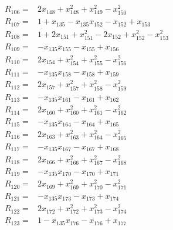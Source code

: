 \documentclass[11pt]{article}
\theoremstyle{remark}\newtheorem{remark}[theorem]{Remark}
\begin{document}
\begin{align*}
R_{106} ={}& 2x_{148} + x_{148}^{2} + x_{149}^{2} - x_{150}^{2} \\[4pt]
R_{107} ={}& 1 + x_{135} - x_{135}x_{152} - x_{152} + x_{153} \\[4pt]
R_{108} ={}& 1 + 2x_{151} + x_{151}^{2} - 2x_{152} + x_{152}^{2} - x_{153}^{2} \\[4pt]
R_{109} ={}& -x_{135}x_{155} - x_{155} + x_{156} \\[4pt]
R_{110} ={}& 2x_{154} + x_{154}^{2} + x_{155}^{2} - x_{156}^{2} \\[4pt]
R_{111} ={}& -x_{135}x_{158} - x_{158} + x_{159} \\[4pt]
R_{112} ={}& 2x_{157} + x_{157}^{2} + x_{158}^{2} - x_{159}^{2} \\[4pt]
R_{113} ={}& -x_{135}x_{161} - x_{161} + x_{162} \\[4pt]
R_{114} ={}& 2x_{160} + x_{160}^{2} + x_{161}^{2} - x_{162}^{2} \\[4pt]
R_{115} ={}& -x_{135}x_{164} - x_{164} + x_{165} \\[4pt]
R_{116} ={}& 2x_{163} + x_{163}^{2} + x_{164}^{2} - x_{165}^{2} \\[4pt]
R_{117} ={}& -x_{135}x_{167} - x_{167} + x_{168} \\[4pt]
R_{118} ={}& 2x_{166} + x_{166}^{2} + x_{167}^{2} - x_{168}^{2} \\[4pt]
R_{119} ={}& -x_{135}x_{170} - x_{170} + x_{171} \\[4pt]
R_{120} ={}& 2x_{169} + x_{169}^{2} + x_{170}^{2} - x_{171}^{2} \\[4pt]
R_{121} ={}& -x_{135}x_{173} - x_{173} + x_{174} \\[4pt]
R_{122} ={}& 2x_{172} + x_{172}^{2} + x_{173}^{2} - x_{174}^{2} \\[4pt]
R_{123} ={}& 1 - x_{135}x_{176} - x_{176} + x_{177} \\[4pt]

\end{align*}
\end{document}
